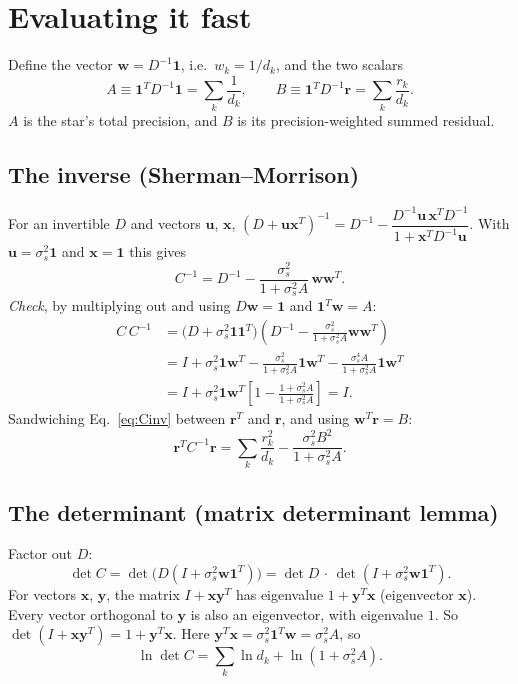 \documentclass[11pt]{article}
\newcommand{\one}{\mathbf{1}}
\newcommand{\br}{\mathbf{r}}
\newcommand{\bw}{\mathbf{w}}
\begin{document}
\section{Evaluating it fast}
Define the vector $\bw = D^{-1}\one$, i.e.\ $w_k = 1/d_k$, and the two scalars
\begin{equation}
  A \equiv \one^T D^{-1} \one = \sum_k \frac{1}{d_k},
  \qquad
  B \equiv \one^T D^{-1} \br = \sum_k \frac{r_k}{d_k}.
\end{equation}
$A$ is the star's total precision, and $B$ is its precision-weighted summed residual.

\subsection{The inverse (Sherman--Morrison)}
For an invertible $D$ and vectors $\mathbf{u}$, $\mathbf{x}$,
$(D + \mathbf{u}\mathbf{x}^T)^{-1} = D^{-1} - \dfrac{D^{-1}\mathbf{u}\,\mathbf{x}^T D^{-1}}{1 + \mathbf{x}^T D^{-1}\mathbf{u}}$.
With $\mathbf{u} = \sigma_s^2\one$ and $\mathbf{x} = \one$ this gives
\begin{equation}
  C^{-1} = D^{-1} - \frac{\sigma_s^2}{1 + \sigma_s^2 A}\, \bw\bw^T .
  \label{eq:Cinv}
\end{equation}
\textit{Check}, by multiplying out and using $D\bw = \one$ and $\one^T\bw = A$:
\begin{align*}
  C\,C^{-1}
  &= \big(D + \sigma_s^2\one\one^T\big)\left(D^{-1} - \frac{\sigma_s^2}{1+\sigma_s^2 A}\bw\bw^T\right) \\
  &= I + \sigma_s^2\one\bw^T - \frac{\sigma_s^2}{1+\sigma_s^2 A}\one\bw^T - \frac{\sigma_s^4 A}{1+\sigma_s^2 A}\one\bw^T \\
  &= I + \sigma_s^2\one\bw^T\left[1 - \frac{1 + \sigma_s^2 A}{1+\sigma_s^2 A}\right] = I .
\end{align*}
Sandwiching Eq.~\eqref{eq:Cinv} between $\br^T$ and $\br$, and using $\bw^T\br = B$:
\begin{equation}
  \br^T C^{-1}\br = \sum_k \frac{r_k^2}{d_k} - \frac{\sigma_s^2 B^2}{1 + \sigma_s^2 A}.
  \label{eq:chi2}
\end{equation}

\subsection{The determinant (matrix determinant lemma)}
Factor out $D$:
\begin{equation*}
  \det C = \det\!\big(D(I + \sigma_s^2\bw\one^T)\big) = \det D \,\cdot\, \det(I + \sigma_s^2\bw\one^T).
\end{equation*}
For vectors $\mathbf{x}$, $\mathbf{y}$, the matrix $I + \mathbf{x}\mathbf{y}^T$ has eigenvalue $1 + \mathbf{y}^T\mathbf{x}$
(eigenvector $\mathbf{x}$).
Every vector orthogonal to $\mathbf{y}$ is also an eigenvector, with eigenvalue $1$.
So $\det(I + \mathbf{x}\mathbf{y}^T) = 1 + \mathbf{y}^T\mathbf{x}$.
Here $\mathbf{y}^T\mathbf{x} = \sigma_s^2\one^T\bw = \sigma_s^2 A$, so
\begin{equation}
  \ln\det C = \sum_k \ln d_k + \ln(1 + \sigma_s^2 A).
  \label{eq:logdet}
\end{equation}
\end{document}
